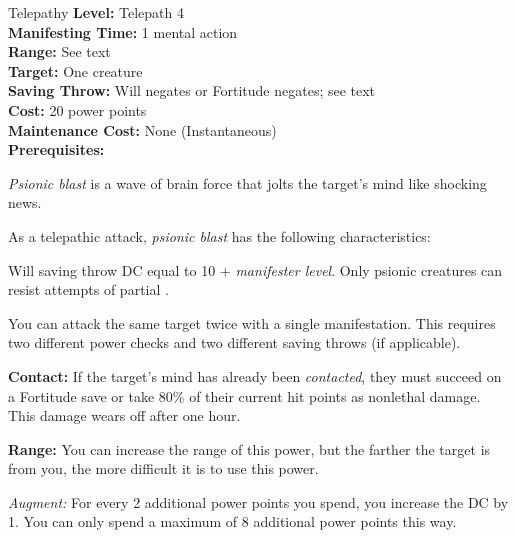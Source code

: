 {Telepathy}
{
	\textbf{Level:}
	Telepath 4\\
	\textbf{Manifesting Time:}
	1 mental action\\
	\textbf{Range:}
	See text\\
	\textbf{Target:}
	One creature\\
	\textbf{Saving Throw:}
	Will negates or Fortitude negates; see text\\
	\textbf{Cost:}
	20 power points\\
	\textbf{Maintenance Cost:}
	None (Instantaneous)\\
	\textbf{Prerequisites:}
	\\
}
{
	\emph{Psionic blast} is a wave of brain force that jolts the target's mind like shocking news.

	As a telepathic attack, \emph{psionic blast} has the following characteristics:
	\begin{itemize*}
		\item Will saving throw DC equal to 10 + \textit{manifester level}. Only psionic creatures can resist attempts of partial .
		\item You can attack the same target twice with a single manifestation. This requires two different power checks and two different saving throws (if applicable).
	\end{itemize*}

	\textbf{Contact:} If the target's mind has already been \emph{contacted}, they must succeed on a Fortitude save or take 80\% of their current hit points as nonlethal damage. This damage wears off after one hour.
	
	\textbf{Range:} You can increase the range of this power, but the farther the target is from you, the more difficult it is to use this power.


	\textit{Augment:} For every 2 additional power points you spend, you increase the DC by 1. You can only spend a maximum of 8 additional power points this way.
}

